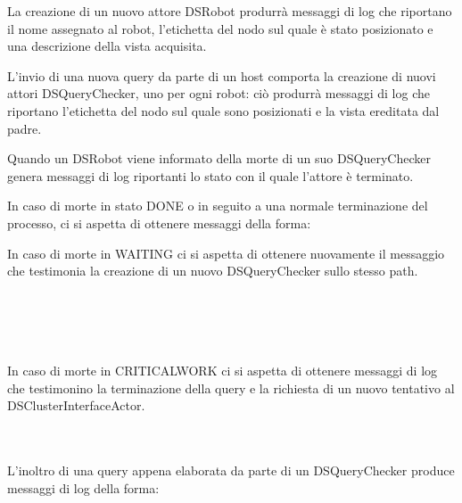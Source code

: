 La creazione di un nuovo attore DSRobot produrrà messaggi di log che riportano
il nome assegnato al robot, l'etichetta del nodo sul quale è stato posizionato
e una descrizione della vista acquisita.\\


L'invio di una nuova query da parte di un host comporta la creazione di nuovi attori DSQueryChecker,
uno per ogni robot: ciò produrrà messaggi di log che riportano
l'etichetta del nodo sul quale sono posizionati e la vista ereditata dal padre.\\


Quando un DSRobot viene informato della morte di un suo DSQueryChecker
genera messaggi di log riportanti lo stato con il quale l'attore è terminato.

In caso di morte in stato DONE o in seguito a una normale terminazione del
processo, ci si aspetta di ottenere messaggi della forma:\\

In caso di morte in WAITING ci si aspetta di ottenere nuovamente il messaggio
che testimonia la creazione di un nuovo DSQueryChecker sullo stesso path.\\
\\
\printlog{[...]}\\
\\
\printlog{[...]}\\

In caso di morte in CRITICALWORK ci si aspetta di ottenere messaggi di log
che testimonino la terminazione della query e la richiesta di un nuovo
tentativo al DSClusterInterfaceActor.\\
\\
\printlog{[...]}\\

L'inoltro di una query appena elaborata da parte di un DSQueryChecker produce
messaggi di log della forma:\\

